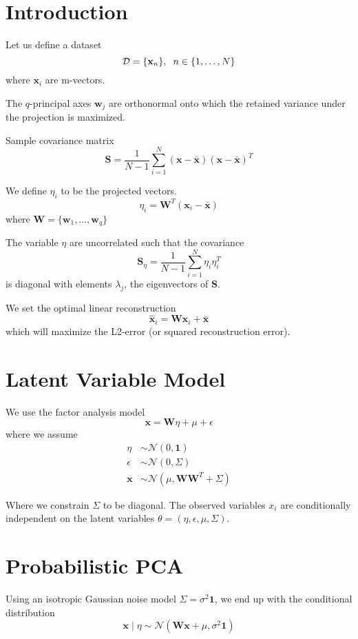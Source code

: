 \documentclass{article}
\numberwithin{equation}{section}
\begin{document}
\section{Introduction}
Let us define a dataset 
$$
    \mathcal{D} = \{\mathbf{x}_n\}, \hspace{0.2cm} n \in \{1, \dots, N\}
$$
where $\mathbf{x}_i$ are m-vectors.

The $q$-principal axes $\mathbf{w}_j$ are orthonormal onto which 
the retained variance under the projection is maximized.

Sample covariance matrix
$$
    \mathbf{S} = \frac{1}{N - 1} \sum_{i = 1}^N (\mathbf{x} - \bar{\mathbf{x}})(\mathbf{x} - \bar{\mathbf{x}})^T
$$

We define $\eta_i$ to be the projected vectors. 
$$
    \eta_i = \mathbf{W}^T (\mathbf{x}_i - \bar{\mathbf{x}})
$$
where $\mathbf{W} = \{\mathbf{w}_1, \dots , \mathbf{w}_q\}$

The variable $\eta$ are uncorrelated such that the covariance 
$$
    \mathbf{S}_\eta = \frac{1}{N - 1}\sum_{i = 1}^N \eta_i \eta_i^T
$$
is diagonal with elements $\lambda_j$, the eigenvectors of $\mathbf{S
}$.

We set the optimal linear reconstruction 
$$
    \hat{\mathbf{x}}_i = \mathbf{W x}_i + \bar{\mathbf{x}}
$$
which will maximize the L2-error (or squared reconstruction error).


\section{Latent Variable Model}

We use the factor analysis model
$$
    \mathbf{x} = \mathbf{W}\eta + \mu + \epsilon
$$
where we assume
\begin{align}
    \eta &\sim \mathcal{N}(0, \mathbf{1}) \\
    \epsilon &\sim \mathcal{N}(0, \Sigma) \\
    \mathbf{x} &\sim \mathcal{N}(\mu, \mathbf{WW}^T + \Sigma)
\end{align}

Where we constrain $\Sigma$ to be diagonal.
The observed variables $x_i$ are conditionally independent on the latent variables $\theta = (\eta, \epsilon, \mu, \Sigma)$.

\section{Probabilistic PCA}
Using an isotropic Gaussian noise model $\Sigma = \sigma^2 \mathbf{1}$, we end up with the conditional distribution
$$
    \mathbf{x} \mid \eta \sim \mathcal{N}(\mathbf{Wx} + \mu, \sigma^2\mathbf{1})
$$
\end{document}
